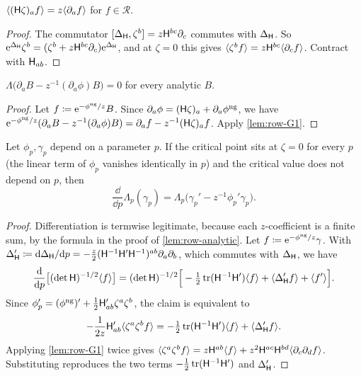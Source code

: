 \begin{lem}
\label{lem:row-G1}
$\langle(\mathsf{H}\zeta)_af\rangle=z\langle\partial_af\rangle$ for $f\in\mathscr{R}$.
\end{lem}

\begin{proof}
The commutator $[\Delta_{\mathsf{H}},\zeta^b]=z\mathsf{H}^{bc}\partial_c$ commutes with $\Delta_{\mathsf{H}}$. So $\mathrm{e}^{\Delta_{\mathsf{H}}}\zeta^b=(\zeta^b+z\mathsf{H}^{bc}\partial_c)\mathrm{e}^{\Delta_{\mathsf{H}}}$, and at $\zeta=0$ this gives $\langle\zeta^bf\rangle=z\mathsf{H}^{bc}\langle\partial_cf\rangle$. Contract with $\mathsf{H}_{ab}$.
\end{proof}

\begin{lem}
\label{lem:row-SP2}
$\Lambda\big(\partial_aB-z^{-1}(\partial_a\phi)B\big)=0$ for every analytic $B$.
\end{lem}

\begin{proof}
Let $f\coloneqq\mathrm{e}^{-\phi^{\mathrm{ng}}/z}B$. Since $\partial_a\phi=(\mathsf{H}\zeta)_a+\partial_a\phi^{\mathrm{ng}}$, we have $\mathrm{e}^{-\phi^{\mathrm{ng}}/z}(\partial_aB-z^{-1}(\partial_a\phi)B)=\partial_af-z^{-1}(\mathsf{H}\zeta)_af$. Apply \cref{lem:row-G1}.
\end{proof}

\begin{lem}
\label{lem:row-FP}
Let $\phi_p,\gamma_p$ depend on a parameter $p$. If the critical point sits at $\zeta=0$ for every $p$ (the linear term of $\phi_p$ vanishes identically in $p$) and the critical value does not depend on $p$, then
\[
\frac{\dd}{\dd p}\Lambda_p(\gamma_p)=\Lambda_p\big(\gamma_p'-z^{-1}\phi_p'\gamma_p\big).
\]
\end{lem}

\begin{proof}
Differentiation is termwise legitimate, because each $z$-coefficient is a finite sum, by the formula in the proof of \cref{lem:row-analytic}. Let $f\coloneqq\mathrm{e}^{-\phi^{\mathrm{ng}}/z}\gamma$. With $\Delta_{\mathsf{H}}'\coloneqq\mathrm{d}\Delta_{\mathsf{H}}/\mathrm{d} p=-\frac z2(\mathsf{H}^{-1}\mathsf{H}'\mathsf{H}^{-1})^{ab}\partial_a\partial_b$, which commutes with $\Delta_{\mathsf{H}}$, we have
\[
\frac{\mathrm{d}}{\mathrm{d} p}\big[(\det\mathsf{H})^{-1/2}\langle f\rangle\big]=(\det\mathsf{H})^{-1/2}\Big[-\tfrac12\operatorname{tr}(\mathsf{H}^{-1}\mathsf{H}')\langle f\rangle+\langle\Delta_{\mathsf{H}}'f\rangle+\langle f'\rangle\Big].
\]
Since $\phi_p'=(\phi^{\mathrm{ng}})'+\frac12\mathsf{H}_{ab}'\zeta^a\zeta^b$, the claim is equivalent to
\[
-\frac{1}{2z}\mathsf{H}_{ab}'\langle\zeta^a\zeta^bf\rangle=-\tfrac12\operatorname{tr}(\mathsf{H}^{-1}\mathsf{H}')\langle f\rangle+\langle\Delta_{\mathsf{H}}'f\rangle.
\]
Applying \cref{lem:row-G1} twice gives $\langle\zeta^a\zeta^bf\rangle=z\mathsf{H}^{ab}\langle f\rangle+z^2\mathsf{H}^{ac}\mathsf{H}^{bd}\langle\partial_c\partial_df\rangle$. Substituting reproduces the two terms $-\frac12\operatorname{tr}(\mathsf{H}^{-1}\mathsf{H}')$ and $\Delta_{\mathsf{H}}'$.
\end{proof}

